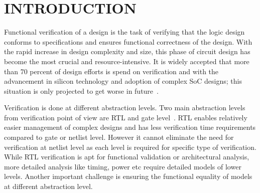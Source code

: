 \chapter{INTRODUCTION}

Functional verification of a design is the task of verifying that the logic design conforms to specifications and ensures functional correctness of the design.  With the rapid increase in design complexity and size, this phase of circuit design has become the most crucial and resource-intensive. It is widely accepted that more than 70 percent of design efforts is spend on verification and with the advancement in silicon technology and adoption of complex SoC designs; this situation is only projected to get worse in future~\citep{phd:zhang}. 

Verification is done at different abstraction levels. Two main abstraction levels from verification point of view are RTL and gate level~\citep{phd:zhang}. RTL enables relatively easier management of complex designs and has less verification time requirements compared to gate or netlist level. However it cannot eliminate the need for verification at netlist level as each level is required for specific type of verification. While RTL verification is apt for functional validation or architectural analysis, more detailed analysis like timing, power etc require detailed models of lower levels. Another important challenge is ensuring the functional equality of models at different abstraction level.  

